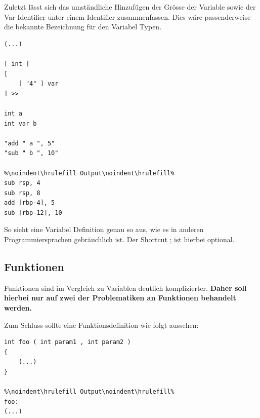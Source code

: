 Zuletzt lässt sich das umständliche Hinzufügen der Grösse der Variable sowie der Var Identifier unter einem Identifier zusammenfassen. Dies wäre passenderweise die bekannte Bezeichnung für den Variabel Typen.

\begin{lstlisting}[language=QHS, caption=Definition einer Variable mit int Identifier]
(...)

[ int ] 
[
    [ "4" ] var
] >>
    
int a 
int var b 
    
"add " a ", 5"
"sub " b ", 10"
        
%\noindent\hrulefill Output\noindent\hrulefill%
sub rsp, 4
sub rsp, 8
add [rbp-4], 5
sub [rbp-12], 10
\end{lstlisting}

So sieht eine Variabel Definition genau so aus, wie es in anderen Programmiersprachen gebräuchlich ist. Der Shortcut ; ist hierbei optional.

\subsection{Funktionen}
Funktionen sind im Vergleich zu Variablen deutlich komplizierter. \textbf{Daher soll hierbei nur auf zwei der Problematiken an Funktionen behandelt werden.}

Zum Schluss sollte eine Funktionsdefinition wie folgt aussehen:


\begin{lstlisting}[language=QHS, label=eg:qhs-function_goal, caption=Ziel für die Definition einer Funktion in QHS]
int foo ( int param1 , int param2 )
{
    (...)
}
            
%\noindent\hrulefill Output\noindent\hrulefill%
foo:
(...)
\end{lstlisting}

